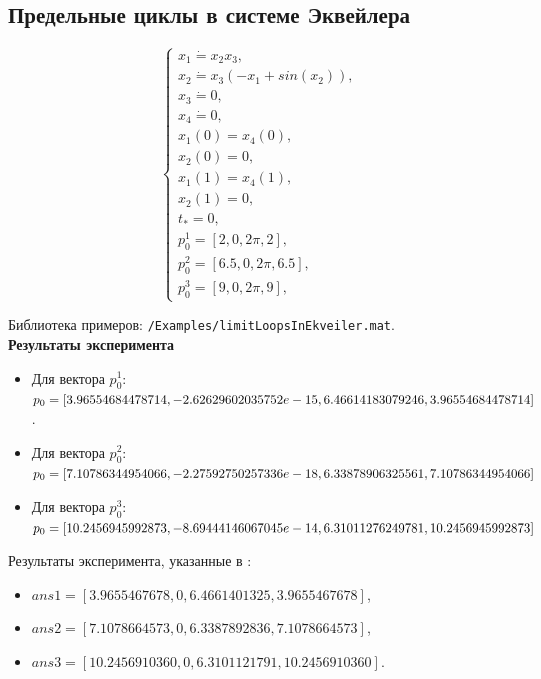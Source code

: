 \subsection{Предельные циклы в системе Эквейлера}
\begin{equation*}
\begin{cases}
x_1\dot=x_2 x_3,\\
x_2\dot=x_3(-x_1+sin(x_2)),\\
x_3\dot=0,\\
x_4\dot=0,\\
x_1(0)=x_4(0),\\
x_2(0)=0,\\
x_1(1)=x_4(1),\\
x_2(1)=0,\\
t_*=0,\\
p_0^1 = [2, 0, 2\pi, 2],\\
p_0^2 = [6.5, 0, 2\pi, 6.5],\\
p_0^3 = [9, 0, 2\pi, 9],
\end{cases}
\end{equation*}

Библиотека примеров: \texttt{/Examples/limitLoopsInEkveiler.mat}.
\newline\\
{\bf Результаты эксперимента}
\begin{itemize}
\item Для вектора $p_0^1$: $p_0=[3.96554684478714,    -2.62629602035752e-15, \\   6.46614183079246,	3.96554684478714]$.
\item Для вектора $p_0^2$: $p_0=[7.10786344954066,    -2.27592750257336e-18, \\	 6.33878906325561,	7.10786344954066]$
\item Для вектора $p_0^3$: $p_0=[10.2456945992873,    -8.69444146067045e-14, \\ 	6.31011276249781,	10.2456945992873]$
\end{itemize}


Результаты эксперимента, указанные в \cite{oy}:
\begin{itemize}
\item $ans1=[3.9655467678, 0, 6.4661401325,3.9655467678]$, 
\item $ans2=[7.1078664573, 0, 6.3387892836,7.1078664573]$,
\item $ans3=[10.2456910360, 0, 6.3101121791, 10.2456910360]$.
\end{itemize}

